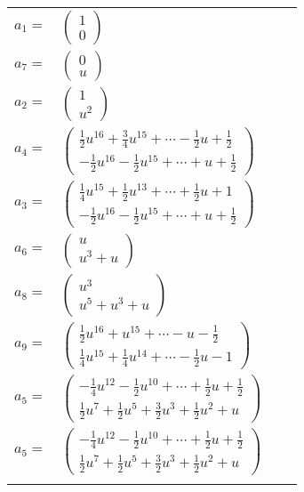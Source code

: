 \documentclass[1p]{elsarticle_modified}
\theoremstyle{definition}
\begin{document}
\begin{tabular}{m{7pt} m{180pt} m{7pt} m{180pt} }
\flushright $a_{1}=$&$\begin{pmatrix}1\\0\end{pmatrix}$ \\
\flushright $a_{7}=$&$\begin{pmatrix}0\\u\end{pmatrix}$ \\
\flushright $a_{2}=$&$\begin{pmatrix}1\\u^2\end{pmatrix}$ \\
\flushright $a_{4}=$&$\begin{pmatrix}\frac{1}{2} u^{16}+\frac{3}{4} u^{15}+\cdots-\frac{1}{2} u+\frac{1}{2}\\-\frac{1}{2} u^{16}-\frac{1}{2} u^{15}+\cdots+u+\frac{1}{2}\end{pmatrix}$ \\
\flushright $a_{3}=$&$\begin{pmatrix}\frac{1}{4} u^{15}+\frac{1}{2} u^{13}+\cdots+\frac{1}{2} u+1\\-\frac{1}{2} u^{16}-\frac{1}{2} u^{15}+\cdots+u+\frac{1}{2}\end{pmatrix}$ \\
\flushright $a_{6}=$&$\begin{pmatrix}u\\u^3+u\end{pmatrix}$ \\
\flushright $a_{8}=$&$\begin{pmatrix}u^3\\u^5+u^3+u\end{pmatrix}$ \\
\flushright $a_{9}=$&$\begin{pmatrix}\frac{1}{2} u^{16}+u^{15}+\cdots- u-\frac{1}{2}\\\frac{1}{4} u^{15}+\frac{1}{4} u^{14}+\cdots-\frac{1}{2} u-1\end{pmatrix}$ \\
\flushright $a_{5}=$&$\begin{pmatrix}-\frac{1}{4} u^{12}-\frac{1}{2} u^{10}+\cdots+\frac{1}{2} u+\frac{1}{2}\\\frac{1}{2} u^7+\frac{1}{2} u^5+\frac{3}{2} u^3+\frac{1}{2} u^2+u\end{pmatrix}$\\ \flushright $a_{5}=$&$\begin{pmatrix}-\frac{1}{4} u^{12}-\frac{1}{2} u^{10}+\cdots+\frac{1}{2} u+\frac{1}{2}\\\frac{1}{2} u^7+\frac{1}{2} u^5+\frac{3}{2} u^3+\frac{1}{2} u^2+u\end{pmatrix}$\\&\end{tabular}
\end{document}
